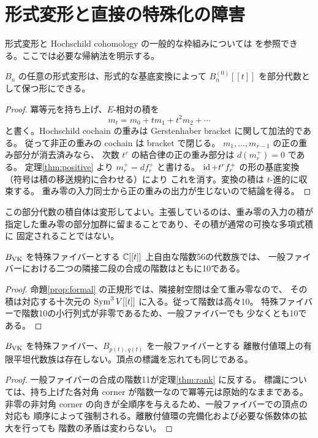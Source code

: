 \section{形式変形と直接の特殊化の障害}\label{sec:formal}
形式変形と Hochschild cohomology の一般的な枠組みについては
\cite{Gerstenhaber} を参照できる。ここでは必要な帰納法を明示する。
\begin{proposition}\label{prop:formal}
$B_n$ の任意の形式変形は、形式的な基底変換によって
$B_n^{(0)}[[t]]$ を部分代数として保つ形にできる。
\end{proposition}
\begin{proof}
冪等元を持ち上げ、$E$-相対の積を
\[
 m_t=m_0+t m_1+t^2m_2+\cdots
\]
と書く。Hochschild cochain の重みは Gerstenhaber bracket に関して加法的である。
従って非正の重みの cochain は bracket で閉じる。
$m_1,\ldots,m_{r-1}$ の正の重み部分が消去済みなら、
次数 $t^r$ の結合律の正の重み部分は $d(m_r^+)=0$ である。
定理\ref{thm:positive} より $m_r^+=d f_r^+$ と書ける。
$\operatorname{id}+t^r f_r^+$ の形の基底変換（符号は積の移送規約に合わせる）により
これを消す。変換の積は $t$-進的に収束する。
重み零の入力同士から正の重みの出力が生じないので結論を得る。
\end{proof}

この部分代数の積自体は変形してよい。主張しているのは、重み零の入力の積が
指定した重み零の部分加群に留まることであり、その積が通常の可換な多項式積に
固定されることではない。

\begin{theorem}[二段の合成の階数の形式的不変性]\label{thm:rank}
$B_{\mathrm{VK}}$ を特殊ファイバーとする $\mathbb C[[t]]$ 上自由な階数56の代数族では、
一般ファイバーにおける二つの隣接二段の合成の階数はともに10である。
\end{theorem}
\begin{proof}
命題\ref{prop:formal} の正規形では、隣接射空間は全て重み零なので、
その積は対応する十次元の $\operatorname{Sym}^3V[[t]]$ に入る。従って階数は高々10。
特殊ファイバーで階数10の小行列式が非零であるため、一般ファイバーでも
少なくとも10である。
\end{proof}

\begin{corollary}\label{cor:nospecial}
$B_{\mathrm{VK}}$ を特殊ファイバー、$B_{p(t),q(t)}$ を一般ファイバーとする
離散付値環上の有限平坦代数族は存在しない。頂点の標識を忘れても同じである。
\end{corollary}
\begin{proof}
一般ファイバーの合成の階数11が定理\ref{thm:rank} に反する。
標識については、持ち上げた各対角 corner が階数一なので冪等元は原始的なままである。
非零の非対角 corner の向きが全順序を与えるため、一般ファイバーでの頂点の対応も
順序によって強制される。離散付値環の完備化および必要な係数体の拡大を行っても
階数の矛盾は変わらない。
\end{proof}

